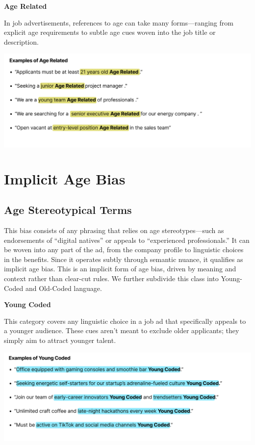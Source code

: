 \documentclass[
]{book}
\begin{document}
{\textbf{Age Related}}

In job advertisements, references to age can take many forms---ranging from explicit age requirements to subtle age cues woven into the job title or description.

\includegraphics{images/Age_Related.png}

\section{Implicit Age Bias}\label{implicit-age-bias}

\subsection*{Age Stereotypical Terms}\label{age-implicit-bias}

This bias consists of any phrasing that relies on age stereotypes---such as endorsements of ``digital natives'' or appeals to ``experienced professionals.'' It can be woven into any part of the ad, from the company profile to linguistic choices in the benefits. Since it operates subtly through semantic nuance, it qualifies as implicit age bias. This is an implicit form of age bias, driven by meaning and context rather than clear-cut rules. We further subdivide this class into Young-Coded and Old-Coded language.

{\textbf{Young Coded}}

This category covers any linguistic choice in a job ad that specifically appeals to a younger audience. These cues aren't meant to exclude older applicants; they simply aim to attract younger talent.

\includegraphics{images/example_young_coded.png}
\end{document}
